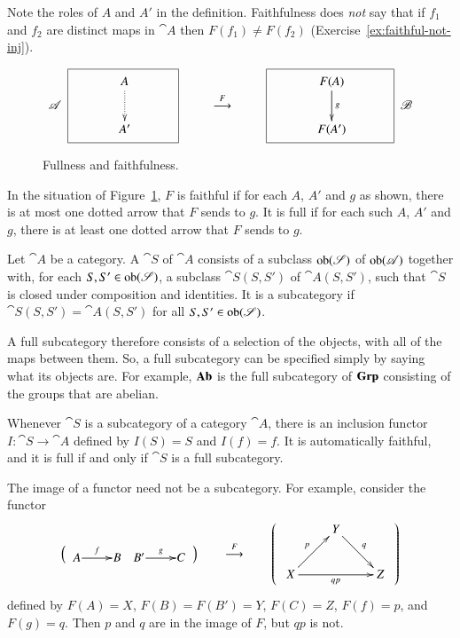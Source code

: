 \begin{warning}
Note the roles of $A$ and $A'$ in the definition.  Faithfulness does
\emph{not} say that if $f_1$ and $f_2$ are distinct maps in $\cat{A}$ then
$F(f_1) \neq F(f_2)$ (Exercise~\ref{ex:faithful-not-inj}).
% 
\begin{figure}
\[
\cat{A}
\begin{array}{c}
\fbox{ 
\xymatrix{
\ &A\vphantom{F(A)} \ar@{.>}[d]&\ \\ &A'\vphantom{F(A')}
}
}
\end{array}
\qquad%
\toby{F}%
\qquad%
\begin{array}{c}
\fbox{ 
\xymatrix{
\ &F(A) \ar[d]^g&\  \\ & F(A')
}
}
\end{array}
\cat{B}
\]
\caption{Fullness and faithfulness.}
\label{fig:ff}
\end{figure}
% 
In the situation of Figure~\ref{fig:ff}, $F$ is faithful if for each $A$,
$A'$ and $g$ as shown, there is at most one dotted arrow that $F$ sends to
$g$.  It is full if for each such $A$, $A'$ and $g$, there is at least one
dotted arrow that $F$ sends to $g$.
\end{warning}

\begin{defn}
Let $\cat{A}$ be a category.  A %
%
%
$\cat{S}$ of $\cat{A}$ consists of a subclass $\operatorname{ob}(\mathscr{S})$ of
$\operatorname{ob}(\mathscr{A})$ together with, for each $S, S' \in \operatorname{ob}(\mathscr{S})$, a subclass
$\cat{S}(S, S')$ of $\cat{A}(S, S')$, such that $\cat{S}$ is closed under
composition and identities.  It is a %
%
%
subcategory if $\cat{S}(S, S') = \cat{A}(S, S')$ for all $S, S'
\in \operatorname{ob}(\mathscr{S})$.
\end{defn}

A full subcategory therefore consists of a selection of the objects, with
all of the maps between them.  So, a full subcategory can be specified
simply by saying what its objects are.  For example, $\mathbf{Ab}$ is the full
subcategory of $\mathbf{Grp}$ consisting of the groups that are abelian.

Whenever $\cat{S}$ is a subcategory of a category $\cat{A}$, there is an
inclusion functor $I: \cat{S} \to \cat{A}$ defined by $I(S) = S$ and $I(f)
= f$.  It is automatically faithful, and it is full if and only if
$\cat{S}$ is a full subcategory.

\begin{warning}
The image%
%
%
%
of a functor need not be a subcategory.  For example, consider the functor
\[
\Bigl(
\begin{array}{c}
\xymatrix@1{A \ar[r]^-f&B\quad B' \ar[r]^-g&C}
\end{array}
\Bigr)
\qquad
\toby{F}
\qquad
\left(
\begin{array}{c}
\xymatrix{
        &Y \ar[dr]^q    &       \\
X \ar[ur]^p \ar[rr]_{qp} &&Z
}
\end{array}
\right)
\]
defined by $F(A) = X$, $F(B) = F(B') = Y$, $F(C) = Z$, $F(f) = p$, and $F(g) =
q$.  Then $p$ and $q$ are in the image of $F$, but $qp$ is not.
\end{warning}


